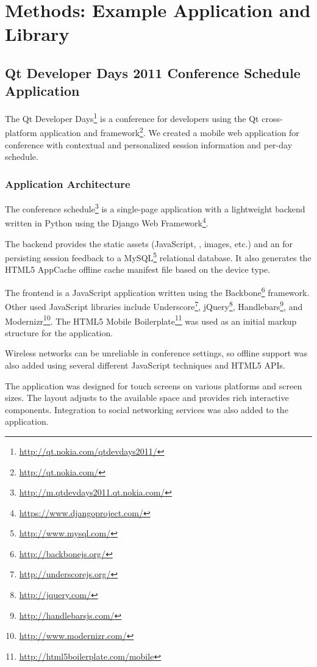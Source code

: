 \chapter{Methods: Example Application and Library}
\label{chapter:methods}

\section{Qt Developer Days 2011 Conference Schedule Application}
\label{section:devdays}

The Qt Developer
Days\footnote{\url{http://qt.nokia.com/qtdevdays2011/}} is a
conference for developers using the Qt cross-platform application and
 framework\footnote{\url{http://qt.nokia.com/}}. We created a
mobile web application for conference with contextual and personalized
session information and per-day schedule.

\subsection{Application Architecture}

The conference
schedule\footnote{\url{http://m.qtdevdays2011.qt.nokia.com/}} is a
single-page application \citationneeded with a lightweight backend
written in Python using the Django Web
Framework\footnote{\url{https://www.djangoproject.com/}}.

The backend provides the static assets (JavaScript, ,
images, etc.) and an  for persisting session feedback to a
MySQL\footnote{\url{http://www.mysql.com/}} relational database. It
also generates the HTML5 AppCache \citationneeded offline cache
manifest file based on the device type.

The frontend is a JavaScript application written using the
Backbone\footnote{\url{http://backbonejs.org/}} 
framework. Other used JavaScript libraries include
Underscore\footnote{\url{http://underscorejs.org/}},
jQuery\footnote{\url{http://jquery.com/}},
Handlebars\footnote{\url{http://handlebarsjs.com/}}, and
Modernizr\footnote{\url{http://www.modernizr.com/}}. The HTML5 Mobile
Boilerplate\footnote{\url{http://html5boilerplate.com/mobile}} was
used as an initial markup structure for the application.

Wireless networks can be unreliable in conference settings, so offline
support was also added using several different JavaScript techniques
and HTML5 APIs.

The application was designed for touch screens on various platforms
and screen sizes. The layout adjusts to the available space and
provides rich interactive components. Integration to social networking
services was also added to the application.


